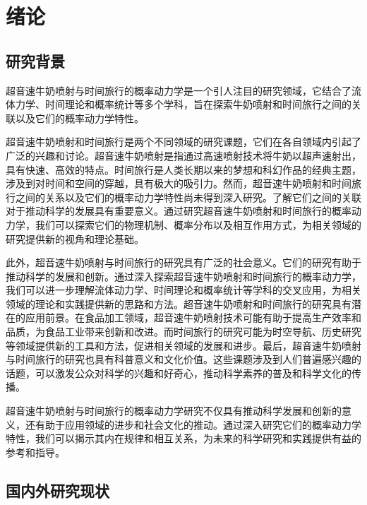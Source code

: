 \chapter{绪论}


\section{研究背景}
超音速牛奶喷射与时间旅行的概率动力学是一个引人注目的研究领域，它结合了流体力学、时间理论和概率统计等多个学科，旨在探索牛奶喷射和时间旅行之间的关联以及它们的概率动力学特性。

超音速牛奶喷射和时间旅行是两个不同领域的研究课题，它们在各自领域内引起了广泛的兴趣和讨论。超音速牛奶喷射是指通过高速喷射技术将牛奶以超声速射出，具有快速、高效的特点。时间旅行是人类长期以来的梦想和科幻作品的经典主题，涉及到对时间和空间的穿越，具有极大的吸引力。然而，超音速牛奶喷射和时间旅行之间的关系以及它们的概率动力学特性尚未得到深入研究。了解它们之间的关联对于推动科学的发展具有重要意义。通过研究超音速牛奶喷射和时间旅行的概率动力学，我们可以探索它们的物理机制、概率分布以及相互作用方式，为相关领域的研究提供新的视角和理论基础。

此外，超音速牛奶喷射与时间旅行的研究具有广泛的社会意义。它们的研究有助于推动科学的发展和创新。通过深入探索超音速牛奶喷射和时间旅行的概率动力学，我们可以进一步理解流体动力学、时间理论和概率统计等学科的交叉应用，为相关领域的理论和实践提供新的思路和方法。超音速牛奶喷射和时间旅行的研究具有潜在的应用前景。在食品加工领域，超音速牛奶喷射技术可能有助于提高生产效率和品质，为食品工业带来创新和改进。而时间旅行的研究可能为时空导航、历史研究等领域提供新的工具和方法，促进相关领域的发展和进步。最后，超音速牛奶喷射与时间旅行的研究也具有科普意义和文化价值。这些课题涉及到人们普遍感兴趣的话题，可以激发公众对科学的兴趣和好奇心，推动科学素养的普及和科学文化的传播。

超音速牛奶喷射与时间旅行的概率动力学研究不仅具有推动科学发展和创新的意义，还有助于应用领域的进步和社会文化的推动。通过深入研究它们的概率动力学特性，我们可以揭示其内在规律和相互关系，为未来的科学研究和实践提供有益的参考和指导。


\section{国内外研究现状}
